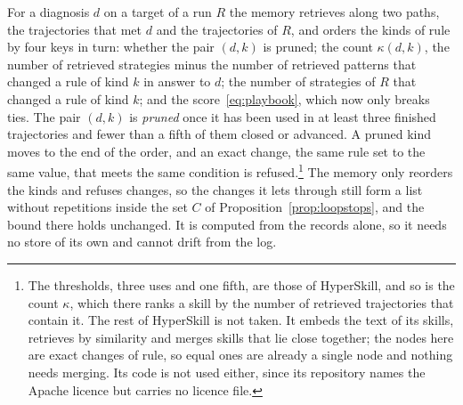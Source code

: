For a diagnosis $d$ on a target of a run $R$ the memory retrieves along two paths, the trajectories that met $d$ and the trajectories of $R$, and orders the kinds of rule by four keys in turn: whether the pair $(d,k)$ is pruned; the count $\kappa(d,k)$, the number of retrieved strategies minus the number of retrieved patterns that changed a rule of kind $k$ in answer to $d$; the number of strategies of $R$ that changed a rule of kind $k$; and the score~\eqref{eq:playbook}, which now only breaks ties. The pair $(d,k)$ is \emph{pruned} once it has been used in at least three finished trajectories and fewer than a fifth of them closed or advanced. A pruned kind moves to the end of the order, and an exact change, the same rule set to the same value, that meets the same condition is refused.\footnote{The thresholds, three uses and one fifth, are those of HyperSkill, and so is the count $\kappa$, which there ranks a skill by the number of retrieved trajectories that contain it. The rest of HyperSkill is not taken. It embeds the text of its skills, retrieves by similarity and merges skills that lie close together; the nodes here are exact changes of rule, so equal ones are already a single node and nothing needs merging. Its code is not used either, since its repository names the Apache licence but carries no licence file.} The memory only reorders the kinds and refuses changes, so the changes it lets through still form a list without repetitions inside the set $C$ of Proposition~\ref{prop:loopstops}, and the bound there holds unchanged. It is computed from the records alone, so it needs no store of its own and cannot drift from the log.

